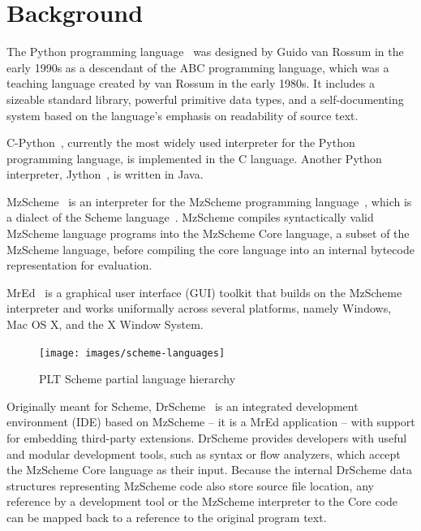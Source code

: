 \section{Background}

The Python programming language~\cite{pythonlang} was designed by Guido van Rossum in the early 1990s as a descendant of the ABC programming language, which was a teaching language created by van Rossum in the early 1980s.  It includes a sizeable standard library, powerful primitive data types, and a self-documenting system based on the language's emphasis on readability of source text.

C-Python~\cite{python}, currently the most widely used interpreter for the Python programming language, is implemented in the C language.  Another Python interpreter, Jython~\cite{jython}, is written in Java.

MzScheme~\cite{mzscheme} is an interpreter for the MzScheme programming language~\cite{mzschemelang}, which is a dialect of the Scheme language~\cite{kelsey98revised}.  MzScheme compiles syntactically valid MzScheme language programs into the MzScheme Core language, a subset of the MzScheme language, before compiling the core language into an internal bytecode representation for evaluation.

MrEd~\cite{mred} is a graphical user interface (GUI) toolkit that builds on the MzScheme interpreter and works uniformally across several platforms, namely Windows, Mac OS X, and the X Window System.

\begin{figure}
	\caption{PLT Scheme partial language hierarchy}
	\label{schemelanguagesfig}
	\begin{center}
		\texttt{[image: images/scheme-languages]}
	\end{center}
\end{figure}

Originally meant for Scheme, DrScheme~\cite{bruce97drscheme} is an integrated development environment (IDE) based on MzScheme -- it is a MrEd application -- with support for embedding third-party extensions.  DrScheme provides developers with useful and modular development tools, such as syntax or flow analyzers, which accept the MzScheme Core language as their input.  Because the internal DrScheme data structures representing MzScheme code also store source file location, any reference by a development tool or the MzScheme interpreter to the Core code can be mapped back to a reference to the original program text.

